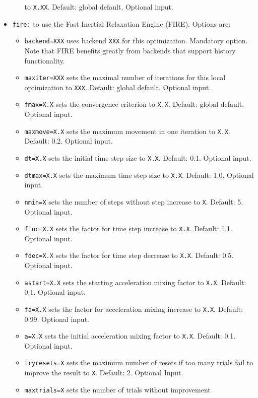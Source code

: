 \documentclass[a4paper,10pt]{scrbook}
\begin{document}
\begin{itemize}
\begin{itemize}
to \texttt{X.XX}. Default: global default. Optional input.
    \end{itemize}
  \item \texttt{fire:} to use the Fast Inertial Relaxation Engine (FIRE).
Options are:
    \begin{itemize}
      \item \texttt{backend=XXX} uses backend \texttt{XXX} for this
optimization. Mandatory option. Note that FIRE benefits greatly from backends
that support history functionality.
      \item \texttt{maxiter=XXX} sets the maximal number of iterations for this
local optimization to \texttt{XXX}. Default: global default. Optional input.
      \item \texttt{fmax=X.X} sets the convergence criterion to \texttt{X.X}.
Default: global default. Optional input.
      \item \texttt{maxmove=X.X} sets the maximum movement in one iteration
to \texttt{X.X}. Default: 0.2. Optional input.
      \item \texttt{dt=X.X} sets the initial time step size to \texttt{X.X}.
Default: 0.1. Optional input.
      \item \texttt{dtmax=X.X} sets the maximum time step size
to \texttt{X.X}. Default: 1.0. Optional input.
      \item \texttt{nmin=X} sets the number of steps without step increase
to \texttt{X}. Default: 5. Optional input.
      \item \texttt{finc=X.X} sets the factor for time step increase
to \texttt{X.X}. Default: 1.1. Optional input.
      \item \texttt{fdec=X.X} sets the factor for time step decrease
to \texttt{X.X}. Default: 0.5. Optional input.
      \item \texttt{astart=X.X} sets the starting acceleration mixing factor
to \texttt{X.X}. Default: 0.1. Optional input.
      \item \texttt{fa=X.X} sets the factor for acceleration mixing
increase to \texttt{X.X}. Default: 0.99. Optional input.
      \item \texttt{a=X.X} sets the initial acceleration mixing factor
to \texttt{X.X}. Default: 0.1. Optional input.
      \item \texttt{tryresets=X} sets the maximum number of resets if too
many trials fail to improve the result to \texttt{X}. Default: 2.
Optional Input.
      \item \texttt{maxtrials=X} sets the number of trials without improvement

\end{itemize}
\end{itemize}
\end{document}
